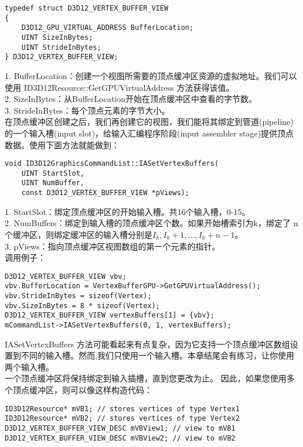 \begin{flushleft}
\begin{lstlisting}
typedef struct D3D12_VERTEX_BUFFER_VIEW
{
    D3D12_GPU_VIRTUAL_ADDRESS BufferLocation;
    UINT SizeInBytes;
    UINT StrideInBytes;
} D3D12_VERTEX_BUFFER_VIEW;
\end{lstlisting}
1. BufferLocation：创建一个视图所需要的顶点缓冲区资源的虚拟地址。我们可以使用 ID3D12Resource::GetGPUVirtualAddress 方法获得该值。\\
2. SizeInBytes：从BufferLocation开始在顶点缓冲区中查看的字节数。 \\
3. StrideInBytes：每个顶点元素的字节大小。\\
在顶点缓冲区创建之后，我们再创建它的视图，我们能将其绑定到管道(pipeline)的一个输入槽(input slot)，给输入汇编程序阶段(input assembler stage)提供顶点数据。使用下面方法就能做到：\\
\begin{lstlisting}
void ID3D12GraphicsCommandList::IASetVertexBuffers(
    UINT StartSlot,
    UINT NumBuffer,
    const D3D12_VERTEX_BUFFER_VIEW *pViews);
\end{lstlisting}
1. StartSlot：绑定顶点缓冲区的开始输入槽。共16个输入槽，0-15。\\
2. NumBuffers：绑定到输入槽的顶点缓冲区个数。如果开始槽索引为k，绑定了 n 个缓冲区，则绑定缓冲区的输入槽分别是$I_{k},I_{k}+1,...,I_{k}+n-1$。\\
3. pViews：指向顶点缓冲区视图数组的第一个元素的指针。\\
调用例子：\\
\begin{lstlisting}
D3D12_VERTEX_BUFFER_VIEW vbv;
vbv.BufferLocation = VertexBufferGPU->GetGPUVirtualAddress();
vbv.StrideInBytes = sizeof(Vertex);
vbv.SizeInBytes = 8 * sizeof(Vertex);
D3D12_VERTEX_BUFFER_VIEW vertexBuffers[1] = {vbv};
mCommandList->IASetVertexBuffers(0, 1, vertexBuffers);
\end{lstlisting}
IASetVertexBuffers 方法可能看起来有点复杂，因为它支持一个顶点缓冲区数组设置到不同的输入槽。然而,我们只使用一个输入槽。本章结尾会有练习，让你使用两个输入槽。\\
一个顶点缓冲区将保持绑定到输入插槽，直到您更改为止。 因此，如果您使用多个顶点缓冲区，则可以像这样构造代码：\\
\begin{lstlisting}
ID3D12Resource* mVB1; // stores vertices of type Vertex1
ID3D12Resource* mVB2; // stores vertices of type Vertex2
D3D12_VERTEX_BUFFER_VIEW_DESC mVBView1; // view to mVB1
D3D12_VERTEX_BUFFER_VIEW_DESC mVBView2; // view to mVB2


\end{lstlisting}
\end{flushleft}
